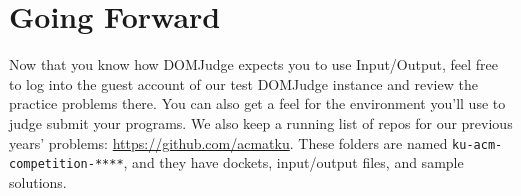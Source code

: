 \documentclass[a4paper]{article}
\def \previousProblemsRepo {https://github.com/acmatku}
\begin{document}
\newpage

\section{Going Forward}
Now that you know how DOMJudge expects you to use Input/Output, feel free to log into the guest account of our test DOMJudge instance and review the practice problems there. You can also get a feel for the environment you'll use to judge submit your programs. We also keep a running list of repos for our previous years' problems: \url{\previousProblemsRepo}. These folders are named \texttt{ku-acm-competition-****}, and they have dockets, input/output files, and sample solutions.
\end{document}
